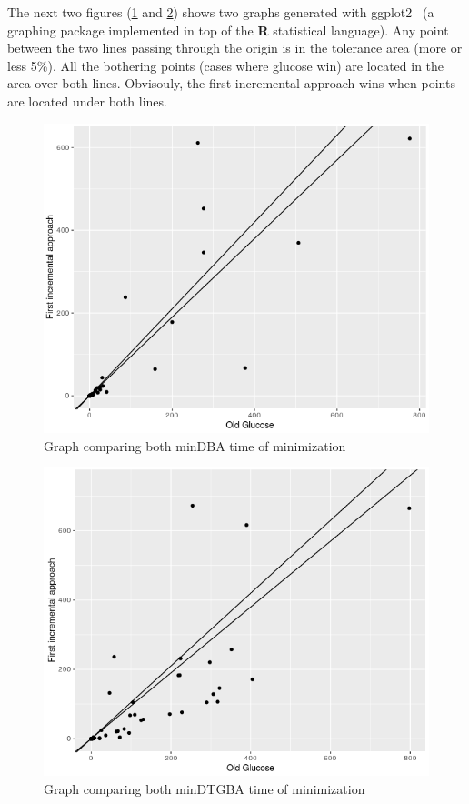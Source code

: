 The next two figures (\ref{fig:glu_vs_incr1_dba} and \ref{fig:glu_vs_incr1_dtgba}) shows two graphs generated
with ggplot2~\cite{23} (a graphing package implemented in top of the \textbf{R} statistical language). Any
point between the two lines passing through the origin is in the tolerance area (more or less 5\%). All the
bothering points (cases where glucose win) are located in the area over both lines. Obvisouly, the
first incremental approach wins when points are located under both lines.

\begin{figure}[H]
 \centering
 \includegraphics[scale=0.6]{img/glu_vs_incr1_dba.png}
 \caption{Graph comparing both minDBA time of minimization}
 \label{fig:glu_vs_incr1_dba}
\end{figure}

\begin{figure}[H]
 \centering
 \includegraphics[scale=0.6]{img/glu_vs_incr1_dtgba.png}
 \caption{Graph comparing both minDTGBA time of minimization}
 \label{fig:glu_vs_incr1_dtgba}
\end{figure}

